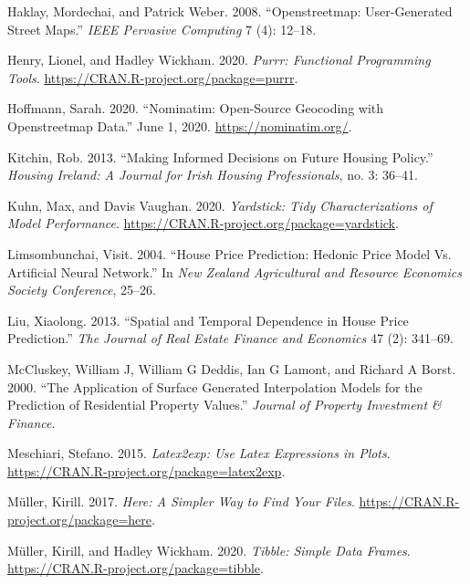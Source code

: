\documentclass[conference,final,]{IEEEtran}
\newlength{\cslhangindent}
\newenvironment{cslreferences}%
  {\setlength{\parindent}{0pt}%
  \everypar{\setlength{\hangindent}{\cslhangindent}}\ignorespaces}%
  {\par}
\begin{document}
\begin{cslreferences}
\leavevmode\hypertarget{ref-haklay2008openstreetmap}{}%
Haklay, Mordechai, and Patrick Weber. 2008. ``Openstreetmap: User-Generated Street Maps.'' \emph{IEEE Pervasive Computing} 7 (4): 12--18.

\leavevmode\hypertarget{ref-R-purrr}{}%
Henry, Lionel, and Hadley Wickham. 2020. \emph{Purrr: Functional Programming Tools}. \url{https://CRAN.R-project.org/package=purrr}.

\leavevmode\hypertarget{ref-nominatim2020}{}%
Hoffmann, Sarah. 2020. ``Nominatim: Open-Source Geocoding with Openstreetmap Data.'' June 1, 2020. \url{https://nominatim.org/}.

\leavevmode\hypertarget{ref-kitchin2013making}{}%
Kitchin, Rob. 2013. ``Making Informed Decisions on Future Housing Policy.'' \emph{Housing Ireland: A Journal for Irish Housing Professionals}, no. 3: 36--41.

\leavevmode\hypertarget{ref-R-yardstick}{}%
Kuhn, Max, and Davis Vaughan. 2020. \emph{Yardstick: Tidy Characterizations of Model Performance}. \url{https://CRAN.R-project.org/package=yardstick}.

\leavevmode\hypertarget{ref-limsombunchai2004house}{}%
Limsombunchai, Visit. 2004. ``House Price Prediction: Hedonic Price Model Vs. Artificial Neural Network.'' In \emph{New Zealand Agricultural and Resource Economics Society Conference}, 25--26.

\leavevmode\hypertarget{ref-liu2013spatial}{}%
Liu, Xiaolong. 2013. ``Spatial and Temporal Dependence in House Price Prediction.'' \emph{The Journal of Real Estate Finance and Economics} 47 (2): 341--69.

\leavevmode\hypertarget{ref-mccluskey2000application}{}%
McCluskey, William J, William G Deddis, Ian G Lamont, and Richard A Borst. 2000. ``The Application of Surface Generated Interpolation Models for the Prediction of Residential Property Values.'' \emph{Journal of Property Investment \& Finance}.

\leavevmode\hypertarget{ref-R-latex2exp}{}%
Meschiari, Stefano. 2015. \emph{Latex2exp: Use Latex Expressions in Plots}. \url{https://CRAN.R-project.org/package=latex2exp}.

\leavevmode\hypertarget{ref-R-here}{}%
Müller, Kirill. 2017. \emph{Here: A Simpler Way to Find Your Files}. \url{https://CRAN.R-project.org/package=here}.

\leavevmode\hypertarget{ref-R-tibble}{}%
Müller, Kirill, and Hadley Wickham. 2020. \emph{Tibble: Simple Data Frames}. \url{https://CRAN.R-project.org/package=tibble}.


\end{cslreferences}
\end{document}

